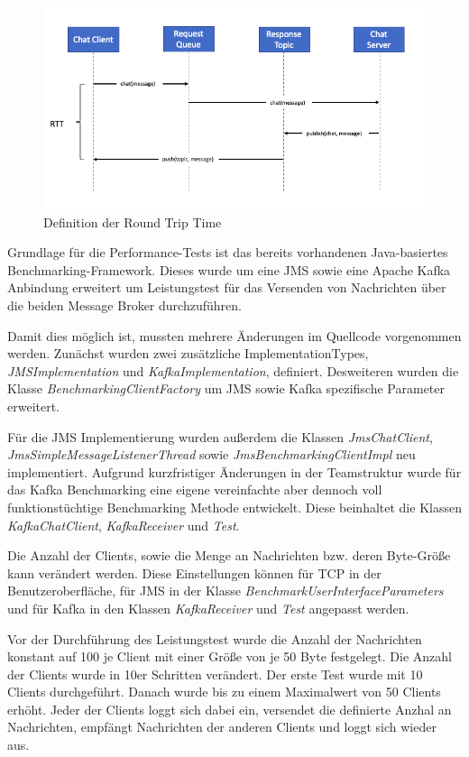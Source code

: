\documentclass[10pt,journal,compsoc]{IEEEtran}
\begin{document}
\begin{figure}[h]
	\centering
	\includegraphics[scale=0.35]{Bilder/RTT.PNG}
	\caption{Definition der Round Trip Time}
	\label{fig:RTT}
\end{figure}

Grundlage für die Performance-Tests ist das bereits vorhandenen Java-basiertes Benchmarking-Framework. Dieses wurde um eine JMS sowie eine Apache Kafka Anbindung erweitert um Leistungstest für das Versenden von Nachrichten über die beiden Message Broker durchzuführen.

Damit dies möglich ist, mussten mehrere Änderungen im Quellcode vorgenommen werden. Zunächst wurden zwei zusätzliche ImplementationTypes, \textit{JMSImplementation} und \textit{KafkaImplementation}, definiert. Desweiteren wurden die Klasse \textit{BenchmarkingClientFactory} um JMS sowie Kafka spezifische Parameter erweitert.

Für die JMS Implementierung wurden außerdem die Klassen \textit{JmsChatClient}, \textit{JmsSimpleMessageListenerThread} sowie \textit{JmsBenchmarkingClientImpl} neu implementiert.
Aufgrund kurzfristiger Änderungen in der Teamstruktur wurde für das Kafka Benchmarking eine eigene vereinfachte aber dennoch voll funktionstüchtige Benchmarking Methode entwickelt. Diese beinhaltet die Klassen \textit{KafkaChatClient}, \textit{KafkaReceiver} und \textit{Test}.

Die Anzahl der Clients, sowie die Menge an Nachrichten bzw. deren Byte-Größe kann verändert werden. Diese Einstellungen können für TCP in der Benutzeroberfläche, für JMS in der Klasse \textit{BenchmarkUserInterfaceParameters} und für Kafka in den Klassen \textit{KafkaReceiver} und \textit{Test} angepasst werden.

Vor der Durchführung des Leistungstest wurde die Anzahl der Nachrichten konstant auf 100 je Client mit einer Größe von je 50 Byte festgelegt. Die Anzahl der Clients wurde in 10er Schritten verändert. Der erste Test wurde mit 10 Clients durchgeführt. Danach wurde bis zu einem Maximalwert von 50 Clients erhöht. Jeder der Clients loggt sich dabei ein, versendet die definierte Anzhal an Nachrichten, empfängt Nachrichten der anderen Clients und loggt sich wieder aus.
\end{document}
